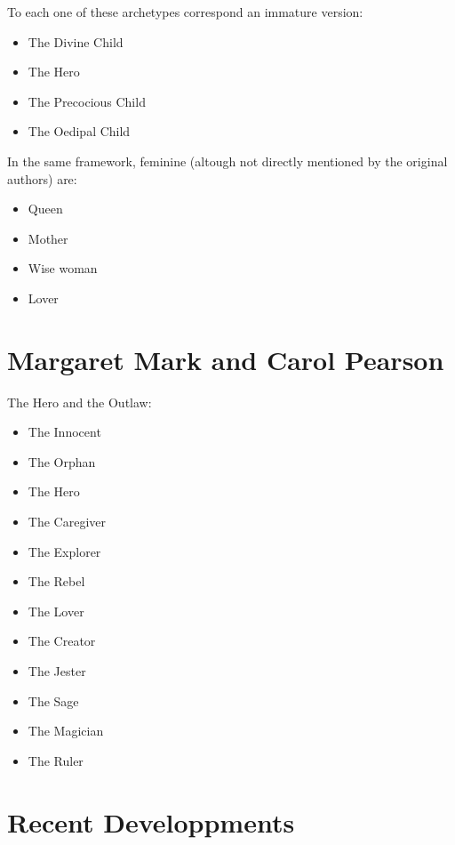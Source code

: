\documentclass[]{book}
\providecommand{\tightlist}{%
  \setlength{\itemsep}{0pt}\setlength{\parskip}{0pt}}
\begin{document}
To each one of these archetypes correspond an immature version:

\begin{itemize}
\tightlist
\item
  The Divine Child
\item
  The Hero
\item
  The Precocious Child
\item
  The Oedipal Child
\end{itemize}

In the same framework, feminine (altough not directly mentioned by the original authors) are:

\begin{itemize}
\tightlist
\item
  Queen
\item
  Mother
\item
  Wise woman
\item
  Lover
\end{itemize}

\hypertarget{margaret-mark-and-carol-pearson}{%
\section{Margaret Mark and Carol Pearson}\label{margaret-mark-and-carol-pearson}}

The Hero and the Outlaw:

\begin{itemize}
\tightlist
\item
  The Innocent
\item
  The Orphan
\item
  The Hero
\item
  The Caregiver
\item
  The Explorer
\item
  The Rebel
\item
  The Lover
\item
  The Creator
\item
  The Jester
\item
  The Sage
\item
  The Magician
\item
  The Ruler
\end{itemize}

\hypertarget{recent-developpments}{%
\section{Recent Developpments}\label{recent-developpments}}
\end{document}
